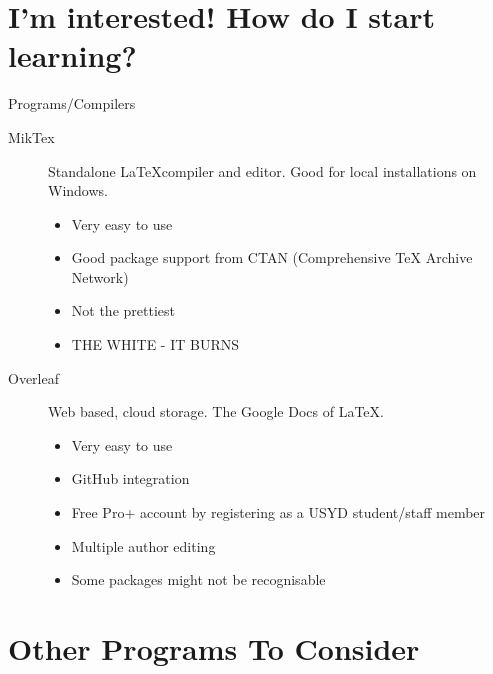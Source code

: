 \documentclass[10pt]{beamer}
\begin{document}
\section{I'm interested! How do I start learning?}
\begin{frame}{Programs/Compilers}
\begin{description}
\item[MikTex] Standalone \LaTeX compiler and editor. Good for local installations on Windows.
\begin{itemize}
\item Very easy to use
\item Good package support from CTAN (Comprehensive TeX Archive Network)
\item Not the prettiest
\item THE WHITE - IT BURNS
\end{itemize}
\item[Overleaf] Web based, cloud storage. The \alert{Google Docs} of \LaTeX.
\begin{itemize}
\item Very easy to use
\item GitHub integration
\item Free Pro+ account by registering as a USYD student/staff member
\item Multiple author editing
\item Some packages might not be recognisable
\end{itemize}
\end{description}
\end{frame}
\section{Other Programs To Consider}
\end{document}
